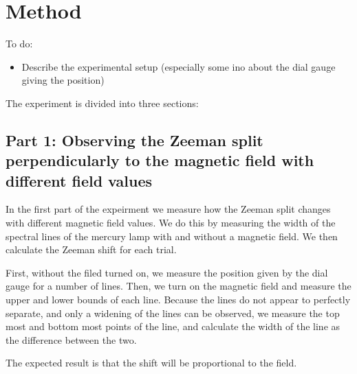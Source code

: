 \section{Method}


To do:
\begin{itemize}
    \item Describe the experimental setup (especially some ino about the dial gauge giving the position)
\end{itemize}

The experiment is divided into three sections:

\subsection{Part 1: Observing the Zeeman split perpendicularly to the magnetic field with different field values}

In the first part of the expeirment we measure how the Zeeman split changes with different magnetic field values.
We do this by measuring the width of the spectral lines of the mercury lamp with and without a magnetic field.
We then calculate the Zeeman shift for each trial.

First, without the filed turned on, we measure the position given by the dial gauge for a number of lines.
Then, we turn on the magnetic field and measure the upper and lower bounds of each line. Because
the lines do not appear to perfectly separate, and only a widening of the lines can be observed,
we measure the top most and bottom most points of the line, and calculate the width of the line as the difference between the two.

The expected result is that the shift will be proportional to the field.